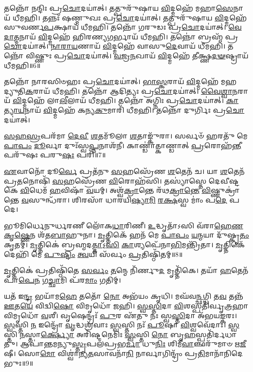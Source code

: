  𑌤𑌨𑍍𑌨𑍋᳴ 𑌨𑌨𑍍𑌦𑌿𑌃 𑌪𑍍𑌰\-\ul{𑌚𑍋}\-𑌦𑌯𑌾॑𑌤𑍍। 
 𑌤𑌤𑍍𑌪𑍁𑌰𑍁᳴𑌷𑌾𑌯 \ul{𑌵𑌿}\-𑌦𑍍𑌮𑌹𑍇᳴ 𑌮𑌹𑌾\-\ul{𑌸𑍇}\-𑌨𑌾𑌯᳴ 𑌧𑍀𑌮𑌹𑌿। 
 𑌤𑌨𑍍𑌨𑌃᳴ 𑌷𑌣𑍍𑌮𑍁𑌖𑌃 𑌪𑍍𑌰\-\ul{𑌚𑍋}\-𑌦𑌯𑌾॑𑌤𑍍। 
 𑌤𑌤𑍍𑌪𑍁𑌰𑍁᳴𑌷𑌾𑌯 \ul{𑌵𑌿}\-𑌦𑍍𑌮𑌹𑍇᳴ 𑌸𑍁𑌵𑌰𑍍𑌣\-\ul{𑌪}\-𑌕𑍍𑌷𑌾𑌯᳴ 𑌧𑍀𑌮𑌹𑌿। 
 𑌤𑌨𑍍𑌨𑍋᳴ 𑌗𑌰𑍁𑌡𑌃 𑌪𑍍𑌰\-\ul{𑌚𑍋}\-𑌦𑌯𑌾॑𑌤𑍍। 
 \ul{𑌵𑍇}\-\-\ul{𑌦𑌾}\-\-\ul{𑌤𑍍𑌮}\-𑌨𑌾𑌯᳴ \ul{𑌵𑌿}\-𑌦𑍍𑌮𑌹𑍇᳴ 𑌹𑌿𑌰𑌣𑍍𑌯\-\ul{𑌗}\-𑌰𑍍𑌭𑌾𑌯᳴ 𑌧𑍀𑌮𑌹𑌿। 
 𑌤𑌨𑍍𑌨𑍋॑ 𑌬𑍍𑌰𑌹𑍍𑌮᳴ 𑌪𑍍𑌰\-\ul{𑌚𑍋}\-𑌦𑌯𑌾॑𑌤𑍍। 
 \ul{𑌨𑌾}\-\-\ul{𑌰𑌾}\-\-\ul{𑌯}\-𑌣𑌾𑌯᳴ \ul{𑌵𑌿}\-𑌦𑍍𑌮𑌹𑍇᳴ 𑌵𑌾𑌸𑍁\-\ul{𑌦𑍇}\-𑌵𑌾𑌯᳴ 𑌧𑍀𑌮𑌹𑌿। 
 𑌤𑌨𑍍𑌨𑍋᳴ 𑌵𑌿𑌷𑍍𑌣𑍁𑌃 𑌪𑍍𑌰\-\ul{𑌚𑍋}\-𑌦𑌯𑌾॑𑌤𑍍। 
 \ul{𑌵}\-\-\ul{𑌜𑍍𑌰}\-\-\ul{𑌨}\-𑌖𑌾𑌯᳴ \ul{𑌵𑌿}\-𑌦𑍍𑌮𑌹𑍇᳴ 𑌤𑍀𑌕𑍍𑌷𑍍𑌣\-\ul{𑌦}\-\-\ul{𑍟}\-𑌷𑍍𑌟𑍍𑌰𑌾𑌯᳴ 𑌧𑍀𑌮𑌹𑌿॥6॥
 
𑌤𑌨𑍍𑌨𑍋᳴ 𑌨𑌾𑌰𑌸𑌿𑍞𑌹𑌃 𑌪𑍍𑌰\-\ul{𑌚𑍋}\-𑌦𑌯𑌾॑𑌤𑍍। 
\-\ul{𑌭𑌾}\-\-\ul{𑌸𑍍𑌕}\-𑌰𑌾𑌯᳴ \ul{𑌵𑌿}\-𑌦𑍍𑌮𑌹𑍇᳴ 𑌮𑌹𑌦𑍍𑌯𑍁𑌤𑌿\-\ul{𑌕}\-𑌰𑌾𑌯᳴ 𑌧𑍀𑌮𑌹𑌿। 
𑌤𑌨𑍍𑌨𑍋᳴ 𑌆𑌦𑌿𑌤𑍍𑌯𑌃 𑌪𑍍𑌰\-\ul{𑌚𑍋}\-𑌦𑌯𑌾॑𑌤𑍍। 
\-\ul{𑌵𑍈}\-\-\ul{𑌶𑍍𑌵𑌾}\-\-\ul{𑌨}\-𑌰𑌾𑌯᳴ \ul{𑌵𑌿}\-𑌦𑍍𑌮𑌹𑍇᳴ 𑌲𑌾\-\ul{𑌲𑍀}\-𑌲𑌾𑌯᳴ 𑌧𑍀𑌮𑌹𑌿। 
𑌤𑌨𑍍𑌨𑍋᳴ 𑌅𑌗𑍍𑌨𑌿𑌃 𑌪𑍍𑌰\-\ul{𑌚𑍋}\-𑌦𑌯𑌾॑𑌤𑍍। 
\-\ul{𑌕𑌾}\-\-\ul{𑌤𑍍𑌯𑌾}\-\-\ul{𑌯}\-𑌨𑌾𑌯᳴ \ul{𑌵𑌿}\-𑌦𑍍𑌮𑌹𑍇᳴ 𑌕𑌨𑍍𑌯\-\ul{𑌕𑍁}\-𑌮𑌾𑌰𑌿᳴ 𑌧𑍀𑌮𑌹𑌿। 
𑌤𑌨𑍍𑌨𑍋᳴ 𑌦𑍁𑌰𑍍𑌗𑌿𑌃 𑌪𑍍𑌰\-\ul{𑌚𑍋}\-𑌦𑌯𑌾॑𑌤𑍍। 


\-\ul{𑌸}\-\-\ul{𑌹}\-\-\ul{𑌸𑍍𑌰}\-𑌪𑌰᳴𑌮𑌾 \ul{𑌦𑍇}\-\-\ul{𑌵𑍀} \ul{𑌶}\-𑌤𑌮𑍂᳴𑌲𑌾 \ul{𑌶}\-𑌤𑌾𑌙𑍍𑌕𑍁᳴𑌰𑌾। 
𑌸𑌰𑍍𑌵𑍞᳴ 𑌹𑌰𑌤𑍁᳴ 𑌮𑍇 \ul{𑌪𑌾}\-\-\ul{𑌪𑌂} \ul{𑌦𑍂}\-𑌰𑍍𑌵𑌾 𑌦𑍁𑌃᳴𑌸𑍍𑌵\-\ul{𑌪𑍍𑌨}\-𑌨𑌾𑌶᳴𑌨𑍀। 
𑌕𑌾𑌣𑍍𑌡𑌾॑𑌤𑍍𑌕𑌾𑌣𑍍𑌡𑌾𑌤𑍍 \ul{𑌪𑍍𑌰}\-𑌰𑍋𑌹᳴\-\ul{𑌨𑍍𑌤𑍀} 𑌪𑌰𑍁᳴𑌷𑌃 𑌪𑌰𑍁\-\ul{𑌷𑌃} 𑌪𑌰𑌿᳴॥7॥

\-\ul{𑌏}\-𑌵𑌾𑌨𑍋᳴ 𑌦𑍂\-\ul{𑌰𑍍𑌵𑍇} 𑌪𑍍𑌰𑌤᳴𑌨𑍁 \ul{𑌸}\-𑌹𑌸𑍍𑌰𑍇᳴𑌣 \ul{𑌶}\-𑌤𑍇𑌨᳴ 𑌚। 
𑌯𑌾 \ul{𑌶}\-𑌤𑍇𑌨᳴ 𑌪𑍍𑌰\-\ul{𑌤}\-𑌨𑍋𑌷𑌿᳴ \ul{𑌸}\-𑌹𑌸𑍍𑌰𑍇᳴𑌣 \ul{𑌵𑌿}\-𑌰𑍋𑌹᳴𑌸𑌿। 
𑌤𑌸𑍍𑌯𑌾॑𑌸𑍍𑌤𑍇 𑌦𑍇𑌵𑍀𑌷𑍍𑌟𑌕𑍇 \ul{𑌵𑌿}\-𑌧𑍇𑌮᳴ \ul{𑌹}\-𑌵𑌿𑌷𑌾᳴ \ul{𑌵}\-𑌯𑌮𑍍। 
𑌅𑌶𑍍𑌵᳴\-\ul{𑌕𑍍𑌰𑌾}\-𑌨𑍍𑌤𑍇 𑌰᳴𑌥\-\ul{𑌕𑍍𑌰𑌾}\-\-\ul{𑌨𑍍𑌤𑍇} \ul{𑌵𑌿}\-𑌷𑍍𑌣𑍁𑌕𑍍𑌰𑌾॑𑌨𑍍𑌤𑍇 \ul{𑌵}\-𑌸𑍁𑌨𑍍𑌧᳴𑌰𑌾। 
𑌶𑌿𑌰𑌸𑌾᳴ 𑌧𑌾𑌰𑌯𑌿\-\ul{𑌷𑍍𑌯𑌾}\-\-\ul{𑌮𑌿} \ul{𑌰}\-\-\ul{𑌕𑍍𑌷}\-𑌸𑍍𑌵 𑌮𑌾𑌂॑ 𑌪\-\ul{𑌦𑍇} 𑌪𑌦𑍇।

 𑌭𑍂𑌮𑌿𑌰𑍍𑌧𑍇𑌨𑍁𑌰𑍍𑌧𑌰𑌣𑍀 𑌲𑍋᳴𑌕\-\ul{𑌧𑌾}\-𑌰𑌿𑌣𑍀। 
 \ul{𑌉}\-𑌦𑍍𑌧𑍃𑌤𑌾᳴𑌽𑌸𑌿 𑌵᳴𑌰𑌾\-\ul{𑌹𑍇}\-\-\ul{𑌣} \ul{𑌕𑍃}\-\-\ul{𑌷𑍍𑌣𑍇}\-𑌨 𑌶᳴𑌤\-\ul{𑌬𑌾}\-𑌹𑍁𑌨𑌾। 
 \ul{𑌮𑍃}\-𑌤𑍍𑌤𑌿𑌕𑍇᳴ 𑌹𑌨᳴ 𑌮𑍇 \ul{𑌪𑌾}\-\-\ul{𑌪𑌂} \ul{𑌯}\-\-\ul{𑌨𑍍𑌮}\-𑌯𑌾 𑌦𑍁᳴𑌷𑍍𑌕𑍃\-\ul{𑌤𑌂} 𑌕𑍃𑌤𑌮𑍍। 
 \ul{𑌮𑍃}\-𑌤𑍍𑌤𑌿𑌕𑍇॑ 𑌬𑍍𑌰𑌹𑍍𑌮𑌦\-\ul{𑌤𑍍𑌤𑌾}\-𑌽॒\-\ul{𑌸𑌿} \ul{𑌕𑌾}\-𑌶𑍍𑌯𑌪𑍇᳴𑌨𑌾\-\ul{𑌭𑌿}\-𑌮𑌨𑍍𑌤𑍍𑌰𑌿᳴𑌤𑌾। 
 \ul{𑌮𑍃}\-𑌤𑍍𑌤𑌿𑌕𑍇᳴ 𑌦𑍇𑌹𑌿᳴ 𑌮𑍇 \ul{𑌪𑍁}\-\-\ul{𑌷𑍍𑌟𑌿𑌂} \ul{𑌤𑍍𑌵}\-𑌯𑌿 𑌸᳴𑌰𑍍𑌵𑌂 \ul{𑌪𑍍𑌰}\-𑌤𑌿𑌷𑍍𑌠𑌿᳴𑌤𑌮𑍍॥8॥
 
 \ul{𑌮𑍃}\-𑌤𑍍𑌤𑌿𑌕𑍇॑ 𑌪𑍍𑌰𑌤𑌿𑌷𑍍𑌠𑌿᳴𑌤𑍇 \ul{𑌸}\-\-\ul{𑌰𑍍𑌵𑌂} \ul{𑌤}\-𑌨𑍍𑌮𑍇 𑌨𑌿᳴𑌰𑍍𑌣𑍁\-\ul{𑌦} 𑌮𑍃𑌤𑍍𑌤𑌿᳴𑌕𑍇। 
 𑌤𑌯𑌾᳴ \ul{𑌹}\-𑌤𑍇𑌨᳴ 𑌪𑌾\-\ul{𑌪𑍇}\-\-\ul{𑌨} \ul{𑌗}\-\-\ul{𑌚𑍍𑌛𑌾}\-𑌮𑌿 𑌪᳴𑌰\-\ul{𑌮𑌾𑌂} 𑌗𑌤𑌿𑌮𑍍।

𑌯𑌤᳴ 𑌇\-\ul{𑌨𑍍𑌦𑍍𑌰} 𑌭𑌯𑌾᳴𑌮\-\ul{𑌹𑍇} 𑌤𑌤𑍋᳴ \ul{𑌨𑍋} 𑌅𑌭᳴𑌯𑌂 𑌕𑍃𑌧𑌿। 
𑌮𑌘᳴𑌵\-\ul{𑌨𑍍𑌛}\-𑌗𑍍𑌧𑌿 𑌤\-\ul{𑌵} 𑌤𑌨𑍍𑌨᳴ \ul{𑌊}\-𑌤\-\ul{𑌯𑍇} 𑌵𑌿𑌦𑍍𑌵𑌿\-\ul{𑌷𑍋} 𑌵𑌿𑌮𑍃𑌧𑍋᳴ 𑌜𑌹𑌿। 
\-\ul{𑌸𑍍𑌵}\-\-\ul{𑌸𑍍𑌤𑌿}\-𑌦𑌾 \ul{𑌵𑌿}\-𑌶𑌸𑍍𑌪𑌤𑌿᳴𑌰𑍍𑌵𑍃\-\ul{𑌤𑍍𑌰}\-𑌹𑌾 𑌵𑌿𑌮𑍃𑌧𑍋᳴ \ul{𑌵}\-𑌶𑍀। 
𑌵𑍃𑌷𑍇𑌨𑍍𑌦𑍍𑌰𑌃᳴ \ul{𑌪𑍁}\-𑌰 𑌏᳴𑌤𑍁 𑌨𑌃 𑌸𑍍𑌵\-\ul{𑌸𑍍𑌤𑌿}\-𑌦𑌾 𑌅᳴𑌭𑌯\-\ul{𑌙𑍍𑌕}\-𑌰𑌃। 
\-\ul{𑌸𑍍𑌵}\-𑌸𑍍𑌤𑌿 \ul{𑌨} 𑌇𑌨𑍍𑌦𑍍𑌰𑍋᳴ \ul{𑌵𑍃}\-𑌦𑍍𑌧𑌶𑍍𑌰᳴𑌵𑌾𑌃 \ul{𑌸𑍍𑌵}\-𑌸𑍍𑌤𑌿 𑌨𑌃᳴ \ul{𑌪𑍂}\-𑌷𑌾 \ul{𑌵𑌿}\-𑌶𑍍𑌵𑌵𑍇᳴𑌦𑌾𑌃। 
\-\ul{𑌸𑍍𑌵}\-𑌸𑍍𑌤𑌿 \ul{𑌨}\-𑌸𑍍𑌤𑌾\-\ul{𑌰𑍍𑌕𑍍𑌷𑍍𑌯𑍋} 𑌅𑌰𑌿᳴𑌷𑍍𑌟𑌨𑍇𑌮𑌿𑌃 \ul{𑌸𑍍𑌵}\-𑌸𑍍𑌤𑌿 \ul{𑌨𑍋} 𑌬𑍃\-\ul{𑌹}\-𑌸𑍍𑌪𑌤𑌿᳴𑌰𑍍𑌦𑌧𑌾𑌤𑍁। 
𑌆𑌪𑌾॑𑌨𑍍𑌤𑌮𑌨𑍍𑌯𑍁\-\ul{𑌸𑍍𑌤𑍃}\-𑌪𑌲᳴𑌪𑍍𑌰𑌭\-\ul{𑌰𑍍𑌮𑌾} 𑌧𑍁\-\ul{𑌨𑌿𑌃} 𑌶𑌿𑌮𑍀᳴\-\ul{𑌵𑌾}\-𑌞𑍍𑌛𑌰𑍁᳴𑌮𑌾𑍞 𑌋\-\ul{𑌜𑍀}\-𑌷𑍀। 
𑌸𑍋\-\ul{𑌮𑍋} 𑌵𑌿𑌶𑍍𑌵𑌾॑𑌨𑍍𑌯\-\ul{𑌤}\-𑌸𑌾𑌵𑌨𑌾᳴\-\ul{𑌨𑌿} 𑌨𑌾𑌰𑍍𑌵𑌾𑌗𑌿𑌨𑍍𑌦𑍍𑌰𑌂᳴ 𑌪𑍍𑌰\-\ul{𑌤𑌿}\-𑌮𑌾𑌨𑌾᳴𑌨𑌿𑌦𑍇𑌭𑍁𑌃॥9॥

